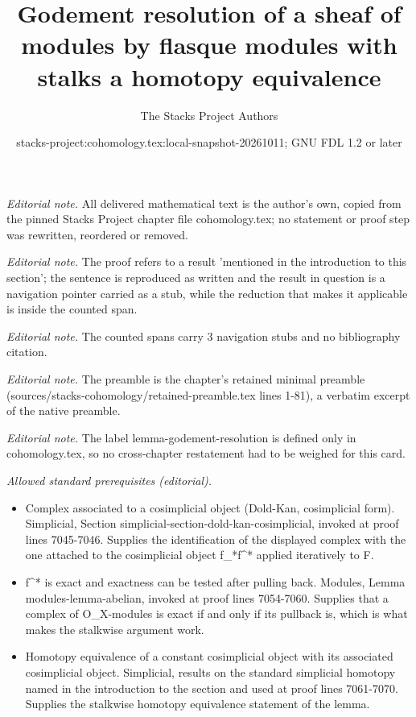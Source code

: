 \documentclass[10pt,a4paper]{amsart}
\title{Godement resolution of a sheaf of modules by flasque modules with stalks a homotopy equivalence}
\author{The Stacks Project Authors}
\date{stacks-project:cohomology.tex:local-snapshot-20261011; GNU FDL 1.2 or later}
\theoremstyle{plain}
\theoremstyle{definition}
\theoremstyle{remark}
\numberwithin{equation}{subsection}
\begin{document}
\maketitle
\noindent\textit{Editorial note.} All delivered mathematical text is the author's own, copied from the pinned Stacks Project chapter file cohomology.tex; no statement or proof step was rewritten, reordered or removed.\par\medskip
\noindent\textit{Editorial note.} The proof refers to a result 'mentioned in the introduction to this section'; the sentence is reproduced as written and the result in question is a navigation pointer carried as a stub, while the reduction that makes it applicable is inside the counted span.\par\medskip
\noindent\textit{Editorial note.} The counted spans carry 3 navigation stubs and no bibliography citation.\par\medskip
\noindent\textit{Editorial note.} The preamble is the chapter's retained minimal preamble (sources/stacks-cohomology/retained-preamble.tex lines 1-81), a verbatim excerpt of the native preamble.\par\medskip
\noindent\textit{Editorial note.} The label lemma-godement-resolution is defined only in cohomology.tex, so no cross-chapter restatement had to be weighed for this card.\par\medskip
\noindent\textit{Allowed standard prerequisites (editorial).}\begin{itemize}
\item Complex associated to a cosimplicial object (Dold-Kan, cosimplicial form). Simplicial, Section simplicial-section-dold-kan-cosimplicial, invoked at proof lines 7045-7046. Supplies the identification of the displayed complex with the one attached to the cosimplicial object f\_*f\textasciicircum{}* applied iteratively to F.
\item f\textasciicircum{}* is exact and exactness can be tested after pulling back. Modules, Lemma modules-lemma-abelian, invoked at proof lines 7054-7060. Supplies that a complex of O\_X-modules is exact if and only if its pullback is, which is what makes the stalkwise argument work.
\item Homotopy equivalence of a constant cosimplicial object with its associated cosimplicial object. Simplicial, results on the standard simplicial homotopy named in the introduction to the section and used at proof lines 7061-7070. Supplies the stalkwise homotopy equivalence statement of the lemma.
\end{itemize}\medskip
\end{document}
